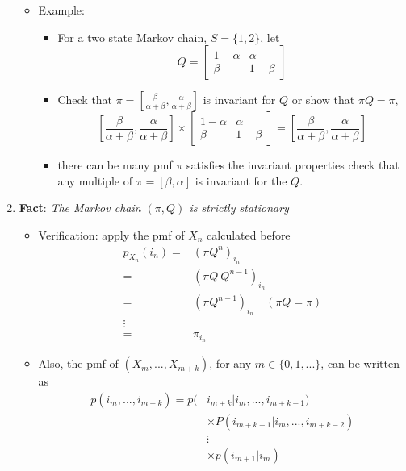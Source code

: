 \documentclass[12pt]{article}
\begin{document}
\begin{enumerate}
\begin{itemize}
    \item Example:
    \begin{itemize}
        \item For a two state Markov chain, $S=\{1,2 \}$, let 
        \[
        Q = \begin{bmatrix}
        1-\alpha & \alpha \\
        \beta & 1-\beta
        \end{bmatrix}
        \]
        \item Check that $\pi =[\frac{\beta}{\alpha + \beta}, \frac{\alpha}{\alpha + \beta}]$ is invariant for $Q$ or show that $\pi Q = \pi$,
        \[
        \left[\frac{\beta}{\alpha + \beta}, \frac{\alpha}{\alpha + \beta}\right] \times  \begin{bmatrix}
        1-\alpha & \alpha \\
        \beta & 1-\beta
        \end{bmatrix}  = \left[\frac{\beta}{\alpha + \beta}, \frac{\alpha}{\alpha + \beta}\right]
        \]
        \item there can be many pmf $\pi$ satisfies the invariant properties check that any multiple of  $\pi =[\beta, \alpha]$ is invariant for the $Q$.
    \end{itemize}
\end{itemize}
\item \textbf{Fact}: \textit{The Markov chain $(\pi, Q)$ is strictly stationary}
\begin{itemize}
    \item Verification: apply the pmf of $X_n$ calculated before
    \begin{align*}
        p_{X_n}(i_n) =& (\pi Q^n)_{i_n}\\
        =& (\pi Q \: Q^{n-1})_{i_n}\\
        =& (\pi Q^{n-1})_{i_n} \quad (\pi Q = \pi)\\
        \vdots & \\
        =& \pi_{i_n}
    \end{align*}
    \item Also, the pmf of $(X_m,...,X_{m+k})$, for any $m\in \{0,1,... \}$, can be written as 
    \begin{align*}
        p(i_m,...,i_{m+k}) = p(&i_{m+k}|i_m,...,i_{m+k-1})\\
               & \times P(i_{m+k-1}|i_m,...,i_{m+k-2})  \\
               & \vdots \\
               & \times p(i_{m+1}|i_m) \\

\end{align*}
\end{itemize}
\end{enumerate}
\end{document}
